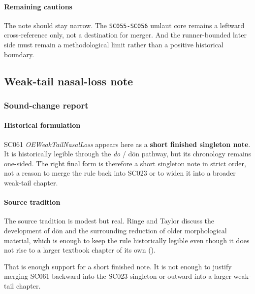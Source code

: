 \documentclass[
  british,
  a4paper,
]{article}
\begin{document}
\paragraph{Remaining cautions}\label{remaining-cautions-38}

The note should stay narrow. The \texttt{SC055-SC056} umlaut core
remains a leftward cross-reference only, not a destination for merger.
And the runner-bounded later side must remain a methodological limit
rather than a positive historical boundary.

\subsection{Weak-tail nasal-loss note}\label{weak-tail-nasal-loss-note}

\subsubsection{Sound-change report}\label{sound-change-report-39}

\paragraph{Historical formulation}\label{historical-formulation-39}

SC061 \emph{OEWeakTailNasalLoss} appears here as a \textbf{short
finished singleton note}. It is historically legible through the
\emph{do} / dōn pathway, but its chronology remains one-sided. The right
final form is therefore a short singleton note in strict order, not a
reason to merge the rule back into SC023 or to widen it into a broader
weak-tail chapter.

\paragraph{Source tradition}\label{source-tradition-39}

The source tradition is modest but real. Ringe and Taylor discuss the
development of dōn and the surrounding reduction of older morphological
material, which is enough to keep the rule historically legible even
though it does not rise to a larger textbook chapter of its own
().

That is enough support for a short finished note. It is not enough to
justify merging SC061 backward into the SC023 singleton or outward into
a larger weak-tail chapter.
\end{document}
